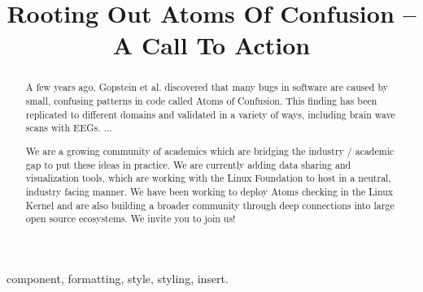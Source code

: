 \documentclass[conference]{IEEEtran}
\begin{document}
\title{Rooting Out Atoms Of Confusion -- A Call To Action}

\author{
\and
{}
\and
{}
\and
{}
}

\maketitle

\begin{abstract}
A few years ago, Gopstein et al. discovered that many bugs in software are 
caused by small, confusing patterns in code called Atoms of Confusion.  This 
finding has been replicated to different domains and validated in a variety of
ways, including brain wave scans with EEGs.   ...

We are a growing  community of academics which are bridging the industry / 
academic gap to put these ideas in practice.  We are currently adding data 
sharing and visualization tools, which are working with the Linux Foundation 
to host in a neutral, industry facing manner.  We 
have been working to deploy Atoms checking in the Linux Kernel and are also 
building a broader community through deep connections into large open source
ecosystems.  We invite you to join us!
\end{abstract}

\begin{IEEEkeywords}
component, formatting, style, styling, insert.
\end{IEEEkeywords}
\end{document}
